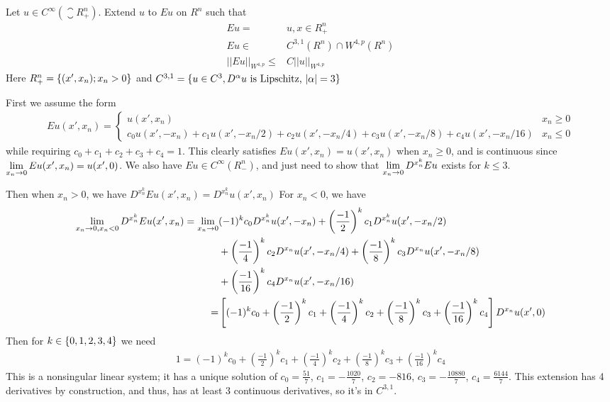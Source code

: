 Let $u \in C^\infty(\closure{R}_+^n)$. Extend $u$ to $E u$ on $R^n$ such that
\begin{align*}
E u = &u, x \in R_+^n\\
E u \in &C^{3, 1}(R^n) \cap W^{4, p}(R^n)\\
||E u||_{W^{4, p}} \leq &C ||u||_{W^{4, p}}
\end{align*}
Here $R_+^n = \{ (x', x_n); x_n > 0 \}$ and $C^{3, 1} = \{ u \in C^3, D^\alpha u \text{ is Lipschitz, } |\alpha| = 3 \}$

First we assume the form
\begin{align*}
E u(x', x_n) =
\begin{cases}
u(x', x_n) & x_n \geq 0\\
c_0 u(x', -x_n) + c_1 u(x', -x_n / 2) + c_2 u(x', -x_n / 4) + c_3 u(x', -x_n / 8) + c_4 u(x', -x_n / 16) & x_n \leq 0
\end{cases}
\end{align*}
while requiring $c_0 + c_1 + c_2 + c_3 + c_4 = 1$.
This clearly satisfies $E u(x', x_n) = u(x', x_n)$ when $x_n \geq 0$, and is continuous since
$\lim \limits_{x_n \rightarrow 0} E u(x', x_n) = u(x', 0)$.
We also have $E u \in C^\infty(R_-^n)$, and just need to show that $\lim \limits_{x_n \rightarrow 0} D^{x_n^k} E u$ exists for $k \leq 3$.

Then when $x_n > 0$, we have $D^{x_n^k} E u(x', x_n) = D^{x_n^k} u(x', x_n)$
For $x_n < 0$, we have
\begin{align*}
\lim \limits_{x_n \rightarrow 0, x_n < 0} D^{x_n^k} E u(x', x_n) =
  \lim \limits_{x_n \rightarrow 0} &(-1)^k c_0 D^{x_n^k} u(x', -x_n) + \left(\frac{-1}{2}\right)^k c_1 D^{x_n^k} u(x', -x_n / 2)\\
  &+ \left( \frac{-1}{4} \right)^k c_2 D^{x_n} u(x', -x_n / 4) + \left( \frac{-1}{8} \right)^k c_3 D^{x_n} u(x', -x_n / 8)\\
  &+ \left( \frac{-1}{16} \right)^k c_4 D^{x_n} u(x', -x_n / 16)\\
  = &\left[ (-1)^k c_0 + \left(\frac{-1}{2}\right)^k c_1 + \left( \frac{-1}{4} \right)^k c_2
     + \left( \frac{-1}{8} \right)^k c_3 + \left( \frac{-1}{16} \right)^k c_4 \right] D^{x_n} u(x', 0)
\end{align*}
Then for $k \in \{ 0, 1, 2, 3, 4 \}$ we need
\begin{align*}
  1 = (-1)^k c_0 + \left(\frac{-1}{2}\right)^k c_1 + \left( \frac{-1}{4} \right)^k c_2
      + \left( \frac{-1}{8} \right)^k c_3 + \left( \frac{-1}{16} \right)^k c_4
\end{align*}
This is a nonsingular linear system; it has a unique solution of $c_0 = \frac{51}{7}$, $c_1 = -\frac{1020}{7}$,
$c_2 = -816$, $c_3 = -\frac{10880}{7}$, $c_4 = \frac{6144}{7}$.
This extension has 4 derivatives by construction, and thus, has at least 3 continuous derivatives, so it's in $C^{3, 1}$.


